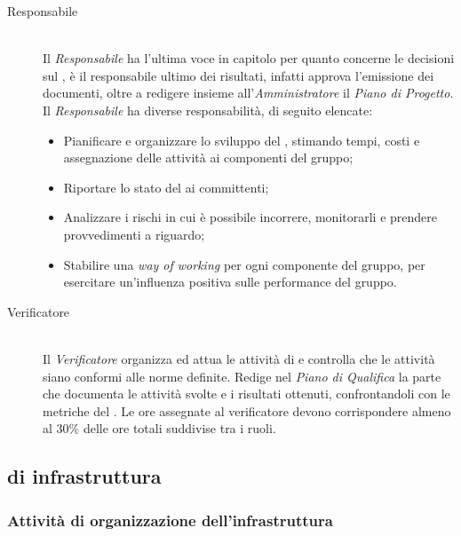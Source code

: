 \begin{description}
\item[Responsabile] \hfill \\ Il \textit{Responsabile} ha l'ultima voce in capitolo per quanto concerne le decisioni sul , \`e il responsabile ultimo dei risultati, infatti approva l'emissione dei documenti, oltre a redigere insieme all'\textit{Amministratore} il \textit{Piano di Progetto}. Il \textit{Responsabile} ha diverse responsabilit\`a, di seguito elencate:
  \begin{itemize}

  \item Pianificare e organizzare lo sviluppo del , stimando tempi, costi e assegnazione delle attivit\`a ai componenti del gruppo;
  \item Riportare lo stato del  ai committenti;
  \item Analizzare i rischi in cui è possibile incorrere, monitorarli e prendere provvedimenti a riguardo;
  \item Stabilire una \textit{way of working} per ogni componente del gruppo, per esercitare un'influenza positiva sulle performance del gruppo.
    
  \end{itemize}

\item[Verificatore] \hfill \\ Il \textit{Verificatore} organizza ed attua le attivit\`a di  e controlla che le attivit\`a siano conformi alle norme definite. Redige nel \textit{Piano di Qualifica} la parte che documenta le attivit\`a svolte e i risultati ottenuti, confrontandoli con le metriche del \PianoDiQualifica. Le ore assegnate al verificatore devono corrispondere almeno al 30\% delle ore totali suddivise tra i ruoli.
  
\end{description}



\subsection{ di infrastruttura}

\subsubsection{Attività di organizzazione dell'infrastruttura}

